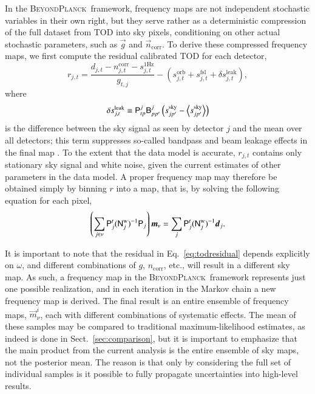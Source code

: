 \documentclass[twocolumn]{aa}
\renewcommand{\d}[0]{\vec{d}}
\newcommand{\n}[0]{\vec{n}}
\newcommand{\m}[0]{\vec{m}}
\newcommand{\B}[0]{\tens{B}}
\newcommand{\g}[0]{\vec{g}}
\newcommand{\N}[0]{\tens{N}}
\renewcommand{\P}[0]{\tens{P}}
\newcommand{\BP}{\textsc{BeyondPlanck}}
\begin{document}
In the \BP\ framework, frequency maps are not independent stochastic
variables in their own right, but they serve rather as a deterministic
compression of the full dataset from TOD into sky pixels, conditioning
on other actual stochastic parameters, such as $\g$ and
$\n_{\mathrm{corr}}$. To derive these compressed frequency maps, we
first compute the residual calibrated TOD for each detector,
\begin{equation}
  r_{j,t} = \frac{d_{j,t}- n^{\mathrm{corr}}_{j,t} - s^{\mathrm{1Hz}}_{j,t}}{g_{t,j}} - \left(s^{\mathrm{orb}}_{j,t}  
  + s^{\mathrm{fsl}}_{j,t} + \delta s^{\mathrm{leak}}_{j, t}\right),
  \label{eq:todresidual}
\end{equation}
where
\begin{equation}
\delta s^{\mathrm{leak}}_{j, t} \equiv \P^{j}_{tp}\B_{pp'}^j\left(s^{\mathrm{sky}}_{jp'} - \left<s^{\mathrm{sky}}_{jp'}\right>\right)
\label{eq:leak}
\end{equation}
is the difference between the sky signal as seen by detector $j$ and
the mean over all detectors; this term suppresses so-called bandpass
and beam leakage effects in the final map \citep{bp09}. To the extent
that the data model is accurate, $r_{j,t}$ contains only stationary
sky signal and white noise, given the current estimates of other
parameters in the data model. A proper frequency map may therefore be
obtained simply by binning $r$ into a map, that is, by solving the
following equation for each pixel,
\begin{equation}
\left(\sum_{j \in \nu} \P_j^t (\N^{\mathrm{w}}_{j})^{-1} \P_j\right) \m_{\nu} =
\sum_j \P_j^t (\N^{\mathrm{w}}_j)^{-1}\d_j.
\label{eq:mapmaking}
\end{equation}

It is important to note that the residual in
Eq.~\eqref{eq:todresidual} depends explicitly on $\omega$, and
different combinations of $g$, $n_{\mathrm{corr}}$, etc., will result
in a different sky map. As such, a frequency map in the \BP\ framework
represents just one possible realization, and in each iteration in the
Markov chain a new frequency map is derived. The final result is an
entire ensemble of frequency maps, $\m_{\nu}^i$, each with different
combinations of systematic effects. The mean of these samples may be
compared to traditional maximum-likelihood estimates, as indeed is
done in Sect.~\ref{sec:comparison}, but it is important
to emphasize that the main product from the current analysis is the
entire ensemble of sky maps, not the posterior mean. The reason is
that only by considering the full set of individual samples is it
possible to fully propagate uncertainties into high-level results.
\end{document}
